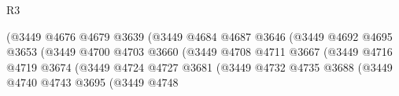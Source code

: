 \begin{lexlean}{R3}
\begin{coremodule}
                                                      (@3449
                                                        @4676
                                                        @4679
                                                        @3639
                                                        (@3449
                                                          @4684
                                                          @4687
                                                          @3646
                                                          (@3449
                                                            @4692
                                                            @4695
                                                            @3653
                                                            (@3449
                                                              @4700
                                                              @4703
                                                              @3660
                                                              (@3449
                                                                @4708
                                                                @4711
                                                                @3667
                                                                (@3449
                                                                  @4716
                                                                  @4719
                                                                  @3674
                                                                  (@3449
                                                                    @4724
                                                                    @4727
                                                                    @3681
                                                                    (@3449
                                                                      @4732
                                                                      @4735
                                                                      @3688
                                                                      (@3449
                                                                        @4740
                                                                        @4743
                                                                        @3695
                                                                        (@3449
                                                                          @4748

\end{coremodule}
\end{lexlean}
